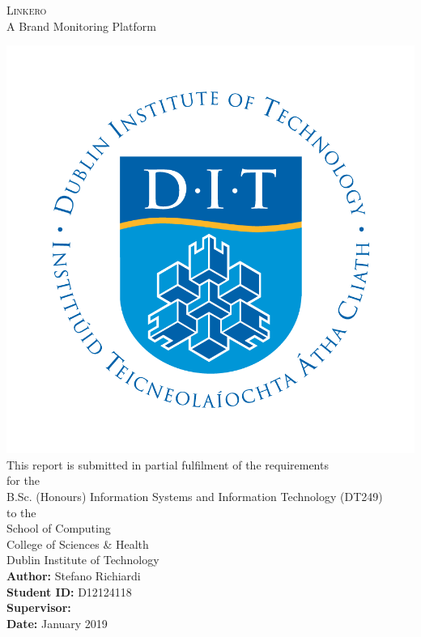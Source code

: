 \begin{titlepage}

\raggedleft
{\Huge\scshape Linkero\\[.2in]}
{\large A Brand Monitoring Platform\\[.2in]}

\includegraphics[scale=0.3]{DIT_logocol2013.png}\\[.2in]
\vfill
{\large This report is submitted in partial fulfilment of the requirements}
\\[.1in]
for the\\[.1in]
{\large B.Sc. (Honours) Information Systems and Information Technology
(DT249)}\\[.1in]
to the\\[.1in]
{\large School of Computing}\\[.05in]
{\large College of Sciences \& Health}\\[.05in]
{\large Dublin Institute of Technology}\\
\vfill
{\bfseries Author:} Stefano Richiardi\\
{\bfseries Student ID:} D12124118 \\
{\bfseries Supervisor:} \\
{\bfseries Date:} January 2019\\

\end{titlepage}